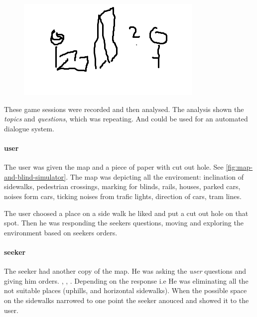 	\begin{figure}[h]
		\centering
		\includegraphics[width=0.7\linewidth]{figures/1stExp-human2humanOverMap/bigpicture}
		\caption[Setup]{}
		\caption{}
		\label{fig:bigpicture}
	\end{figure}

	These game sessions were recorded and then analysed. The analysis shown the \emph{topics} and \emph{questions}, which was repeating. And could be used for an automated dialogue system.
	
	
	\paragraph{ user}
	The user was given the map and a piece of paper with cut out hole. See \ref{fig:map-and-blind-simulator}. The map was depicting all the enviroment: inclination of sidewalks, pedestrian crossings,  marking for blinds, rails, houses, parked cars, noises form cars, ticking noises from trafic lights, direction of cars, tram lines.
	
	The user choosed a place on a side walk he liked and put a cut out hole on that spot. Then he was responding the seekers questions, moving and exploring the environment based on seekers orders.
	
	\paragraph{seeker}
	The seeker had another copy of the map. He was asking the \emph{ user} questions and giving him orders. , , . 
	Depending on the response i.e  He was eliminating all the not suitable places (uphills, and horizontal sidewalks). When the possible space on the sidewalks narrowed to one point the seeker anouced  and showed it to the  user.
	
